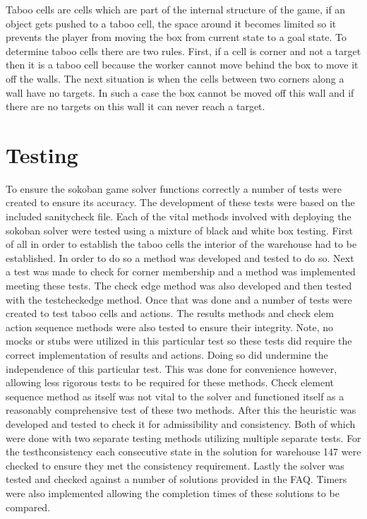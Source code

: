 \documentclass[a4paper,12pt]{article}
\begin{document}
Taboo cells are cells which are part of the internal structure of the game, if an object gets pushed to a taboo cell, the space around it becomes limited so it prevents the player from moving the box from current state to a goal state. To determine taboo cells there are two rules. First, if a cell is corner and not a target then it is a taboo cell because the worker cannot move behind the box to move it off the walls. The next situation is when the cells between two corners along a wall have no targets. In such a case the box cannot be moved off this wall and if there are no targets on this wall it can never reach a target.

\section{Testing}

To ensure the sokoban game solver functions correctly a number of tests were created to ensure its accuracy. The development of these tests were based on the included sanity\textunderscore check file. Each of the vital methods involved with deploying the sokoban solver were tested using a mixture of black and white box testing. First of all in order to establish the taboo cells the interior of the warehouse had to be established. In order to do so a method was developed and tested to do so. Next a test was made to check for corner membership and a method was implemented meeting these tests. The check edge method was also developed and then tested with the test\textunderscore check\textunderscore edge method. Once that was done and a number of tests were created to test taboo cells and actions. The results methods and check elem action sequence methods were also tested to ensure their integrity. Note, no mocks or stubs were utilized in this particular test so these tests did require the correct implementation of results and actions. Doing so did undermine the independence of this particular test. This was done for convenience however, allowing less rigorous tests to be required for these methods. Check element sequence method as itself was not vital to the solver and functioned itself as a reasonably comprehensive test of these two methods. After this the heuristic was developed and tested to check it for admissibility and consistency. Both of which were done with two separate testing methods utilizing multiple separate tests. For the test\textunderscore h\textunderscore consistency each consecutive state in the solution for warehouse 147 were checked to ensure they met the consistency requirement. Lastly the solver was tested and checked against a number of solutions provided in the FAQ. Timers were also implemented allowing the completion times of these solutions to be compared. 
\end{document}
